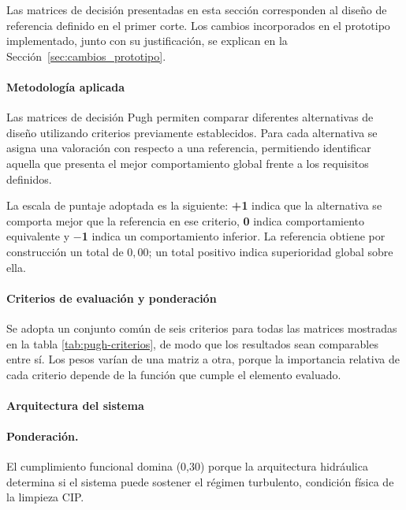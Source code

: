 

Las matrices de decisión presentadas en esta sección corresponden al diseño de referencia definido en el primer corte. Los cambios incorporados en el prototipo implementado, junto con su justificación, se explican en la Sección~\ref{sec:cambios_prototipo}.

\paragraph{Metodología aplicada}

Las matrices de decisión Pugh permiten comparar diferentes alternativas de diseño utilizando criterios previamente establecidos. Para cada alternativa se asigna una valoración con respecto a una referencia, permitiendo identificar aquella que presenta el mejor comportamiento global frente a los requisitos definidos.

La escala de puntaje adoptada es la siguiente: \textbf{+1} indica que la alternativa se comporta mejor que la referencia en ese criterio, \textbf{0} indica comportamiento equivalente y \textbf{$-$1} indica un comportamiento inferior. La referencia obtiene por construcción un total de $0{,}00$; un total positivo indica superioridad global sobre ella.

\paragraph{Criterios de evaluación y ponderación}

Se adopta un conjunto común de seis criterios para todas las matrices mostradas en la tabla \ref{tab:pugh-criterios}, de modo que los resultados sean comparables entre sí. Los pesos varían de una matriz a otra, porque la importancia relativa de cada criterio depende de la función que cumple el elemento evaluado.



\paragraph{Arquitectura del sistema}



\paragraph{Ponderación.} El cumplimiento funcional domina (0,30) porque la arquitectura hidráulica determina si el sistema puede sostener el régimen turbulento, condición física de la limpieza CIP.

